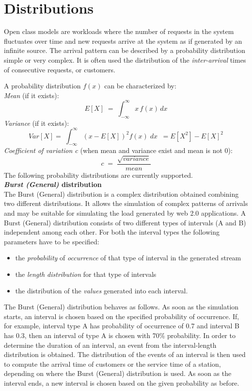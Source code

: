 \section{Distributions}
\label{distns}
Open class models are workloads where the number of
requests in the system fluctuates over time and new  requests
arrive at the system as if generated by an infinite source. The
arrival pattern can be described by a probability distribution
simple or very complex. It is often used the distribution of the
\emph{inter-arrival} times of consecutive requests, or customers.

A probability distribution $f(x)$ can be characterized by:\\
\emph{Mean} (if it exists):
\[
E[X]\; =\;\int_{-\infty}^{\infty} x\, f(x)\,dx
\]
\emph{Variance} (if it exists):
\[
Var[X] = \; \int_{-\infty}^{\infty} (x-E[X])^2 f(x)\; dx \;\; =
E[X^2] - E[X]^2
\]
\emph{Coefficient of variation c} (when mean and variance exist
and mean is not 0):
\[
c\; = \; \frac{\sqrt{variance}}{mean}
\]
The following probability distributions are currently supported.\\

\textbf{\emph{Burst (General)} distribution}\\
The Burst (General) distribution is a complex distribution
obtained combining two different distributions. It allows the
simulation of complex patterns of arrivals and may be suitable for
simulating the load generated by web 2.0 applications. A Burst
(General) distribution consists of two different types of
intervals (A and B) independent among each other. For both the
interval types the following parameters have to be specified:
\begin{itemize}
\item the \emph{probability} of \emph{occurrence} of that type of
interval in the generated stream \item the \emph{length
distribution} for that type of intervals \item the distribution of
the \emph{values} generated into each interval.
\end{itemize}
The Burst (General) distribution behaves as follows. As soon as
the simulation starts, an interval is chosen based on the
specified probability of occurrence. If, for example, interval
type A has probability of occurrence of 0.7 and interval B has
0.3, then an interval of type A is chosen with 70\% probability.
In order to determine the duration of an interval, an event from
the interval-length distribution is obtained. The distribution of
the events of an interval is then used to compute the arrival time
of customers or the service time of a station, depending on where
the Burst (General) distribution is used. As soon as the interval
ends, a new interval is chosen based on the given probability as
before.

